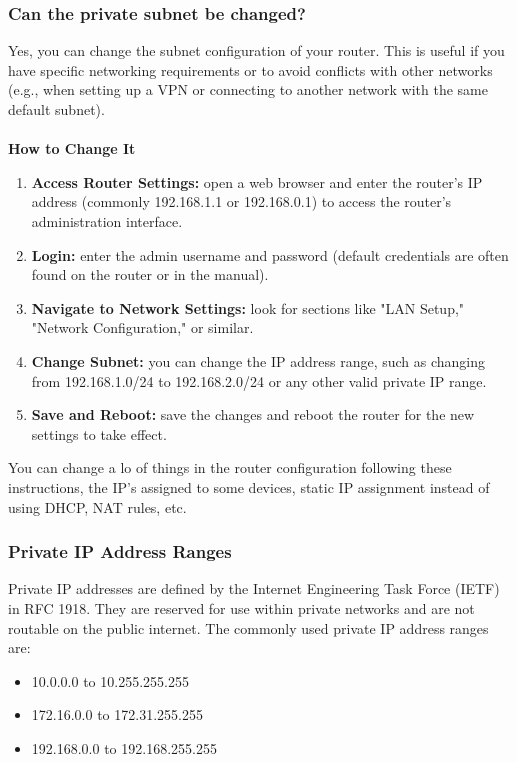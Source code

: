 \documentclass{article}
\newenvironment{blocktemplate}[1]{%
    \tcolorbox[beamer,%
    noparskip,breakable,
    colframe=Blue,%
    colbacklower=LimeGreen!75!LightGreen,%
    title=#1]}%
    {\endtcolorbox}
\begin{document}
\subsubsection{Can the private subnet be changed?}

Yes, you can change the subnet configuration of your router. This is useful if you have specific networking requirements or to avoid conflicts with other networks (e.g., when setting up a VPN or connecting to another network with the same default subnet).
\\\\
\textbf{How to Change It}
\begin{enumerate}
    \item \textbf{Access Router Settings:} open a web browser and enter the router's IP address (commonly 192.168.1.1 or 192.168.0.1) to access the router’s administration interface.
    \item \textbf{Login:} enter the admin username and password (default credentials are often found on the router or in the manual).
    \item \textbf{Navigate to Network Settings:} look for sections like "LAN Setup," "Network Configuration," or similar.
    \item \textbf{Change Subnet:} you can change the IP address range, such as changing from 192.168.1.0/24 to 192.168.2.0/24 or any other valid private IP range.
    \item \textbf{Save and Reboot:} save the changes and reboot the router for the new settings to take effect.
\end{enumerate}

\begin{blocktemplate}{NOTE}
You can change a lo of things in the router configuration following these instructions, the IP's assigned to some devices, static IP assignment instead of using DHCP, NAT rules, etc.
\end{blocktemplate}

\subsubsection{Private IP Address Ranges}

Private IP addresses are defined by the Internet Engineering Task Force (IETF) in RFC 1918. They are reserved for use within private networks and are not routable on the public internet. The commonly used private IP address ranges are:

\begin{itemize}
    \item 10.0.0.0 to 10.255.255.255
    \item 172.16.0.0 to 172.31.255.255
    \item 192.168.0.0 to 192.168.255.255
\end{itemize}
\end{document}
